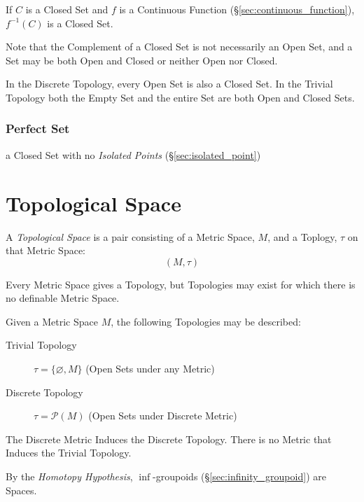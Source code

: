 If $C$ is a Closed Set and $f$ is a Continuous Function
(\S\ref{sec:continuous_function}), $f^{-1}(C)$ is a Closed Set.

\HandRight\; Note that the Complement of a Closed Set is not necessarily
an Open Set, and a Set may be both Open and Closed or neither Open nor
Closed.

In the Discrete Topology, every Open Set is also a Closed Set. In the
Trivial Topology both the Empty Set and the entire Set are both Open
and Closed Sets.



\subsubsection{Perfect Set}\label{sec:perfect_set}

a Closed Set with no \emph{Isolated Points}
(\S\ref{sec:isolated_point})



\section{Topological Space}\label{sec:topological_space}

A \emph{Topological Space} is a pair consisting of a Metric Space,
$M$, and a Toplogy, $\tau$ on that Metric Space:
\[
    (M,\tau)
\]

Every Metric Space gives a Topology, but Topologies may exist for
which there is no definable Metric Space. %

Given a Metric Space $M$, the following Topologies may be described:
\begin{description}
\item[Trivial Topology] $\tau = \{\varnothing, M\}$ (Open Sets under
  any Metric)

\item[Discrete Topology] $\tau = \mathcal{P}(M)$ (Open Sets under
  Discrete Metric)
\end{description}
The Discrete Metric Induces the Discrete Topology. There is no Metric
that Induces the Trivial Topology.

By the \emph{Homotopy Hypothesis}, $\inf$-groupoids
(\S\ref{sec:infinity_groupoid}) are Spaces.



